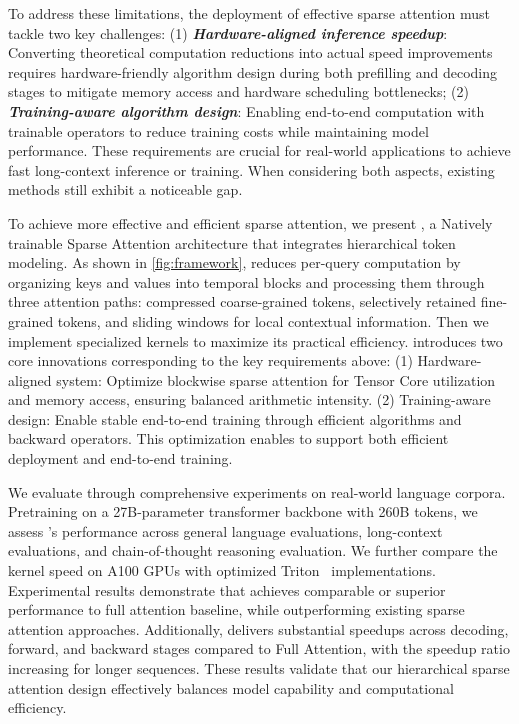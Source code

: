 To address these limitations, the deployment of effective sparse attention must tackle two key challenges: (1) \textbf{\textit{Hardware-aligned inference speedup}}: Converting theoretical computation reductions into actual speed improvements
requires hardware-friendly algorithm design during both prefilling and decoding stages to mitigate memory access and hardware scheduling bottlenecks;
(2) \textbf{\textit{Training-aware algorithm design}}: Enabling end-to-end computation with trainable operators to 
reduce training costs while maintaining model performance.
These requirements are crucial for real-world applications to achieve fast long-context inference or training.
When considering both aspects, existing methods still exhibit a noticeable gap.


To achieve more effective and efficient sparse attention, we present \method{}, a Natively trainable Sparse Attention architecture that integrates hierarchical token modeling. As shown in \cref{fig:framework}, \method{} reduces per-query computation by organizing keys and values into temporal blocks and processing them through three attention paths: compressed coarse-grained tokens, selectively retained fine-grained tokens, and sliding windows for local contextual information. Then we implement specialized kernels to maximize its practical efficiency.
\method{} introduces two core innovations corresponding to the key requirements above:
(1) Hardware-aligned system: Optimize blockwise sparse attention for Tensor Core utilization and memory access, ensuring balanced arithmetic intensity.
(2) Training-aware design: Enable stable end-to-end training through efficient algorithms and backward operators.
This optimization enables \method{} to support both efficient deployment and end-to-end training.


We evaluate \method{} through comprehensive experiments on real-world language corpora. Pretraining on a 27B-parameter transformer backbone with 260B tokens, we assess \method{}'s performance across general language evaluations, long-context evaluations, and chain-of-thought reasoning evaluation. We further compare the kernel speed on A100 GPUs with optimized Triton~\citep{tillet2019triton} implementations. Experimental results demonstrate that \method{} achieves comparable or superior performance to full attention baseline, while outperforming existing sparse attention approaches. Additionally, \method{} delivers substantial speedups across decoding, forward, and backward stages compared to Full Attention, with the speedup ratio increasing for longer sequences. These results validate that our hierarchical sparse attention design effectively balances model capability and computational efficiency.
